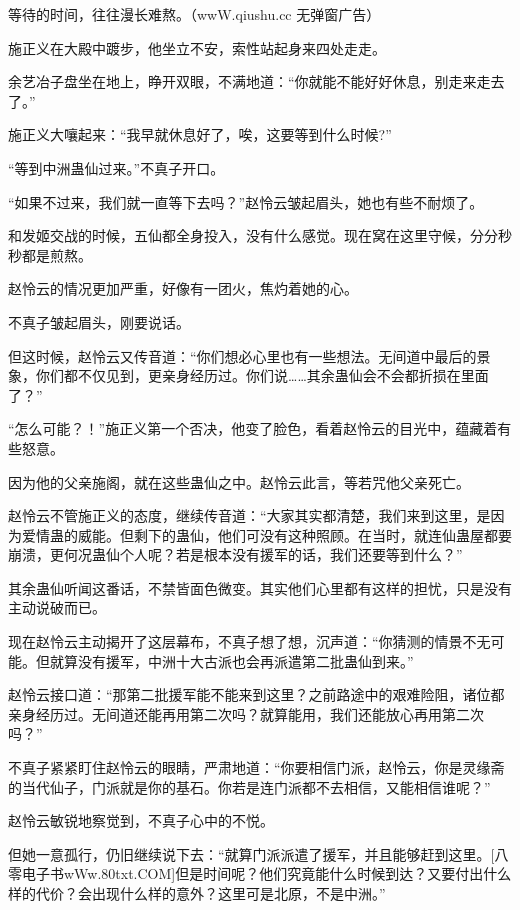 
\begin{this_body}

等待的时间，往往漫长难熬。（wwW.qiushu.cc 无弹窗广告）

施正义在大殿中踱步，他坐立不安，索性站起身来四处走走。

余艺冶子盘坐在地上，睁开双眼，不满地道：“你就能不能好好休息，别走来走去了。”

施正义大嚷起来：“我早就休息好了，唉，这要等到什么时候?”

“等到中洲蛊仙过来。”不真子开口。

“如果不过来，我们就一直等下去吗？”赵怜云皱起眉头，她也有些不耐烦了。

和发姬交战的时候，五仙都全身投入，没有什么感觉。现在窝在这里守候，分分秒秒都是煎熬。

赵怜云的情况更加严重，好像有一团火，焦灼着她的心。

不真子皱起眉头，刚要说话。

但这时候，赵怜云又传音道：“你们想必心里也有一些想法。无间道中最后的景象，你们都不仅见到，更亲身经历过。你们说……其余蛊仙会不会都折损在里面了？”

“怎么可能？！”施正义第一个否决，他变了脸色，看着赵怜云的目光中，蕴藏着有些怒意。

因为他的父亲施阁，就在这些蛊仙之中。赵怜云此言，等若咒他父亲死亡。

赵怜云不管施正义的态度，继续传音道：“大家其实都清楚，我们来到这里，是因为爱情蛊的威能。但剩下的蛊仙，他们可没有这种照顾。在当时，就连仙蛊屋都要崩溃，更何况蛊仙个人呢？若是根本没有援军的话，我们还要等到什么？”

其余蛊仙听闻这番话，不禁皆面色微变。其实他们心里都有这样的担忧，只是没有主动说破而已。

现在赵怜云主动揭开了这层幕布，不真子想了想，沉声道：“你猜测的情景不无可能。但就算没有援军，中洲十大古派也会再派遣第二批蛊仙到来。”

赵怜云接口道：“那第二批援军能不能来到这里？之前路途中的艰难险阻，诸位都亲身经历过。无间道还能再用第二次吗？就算能用，我们还能放心再用第二次吗？”

不真子紧紧盯住赵怜云的眼睛，严肃地道：“你要相信门派，赵怜云，你是灵缘斋的当代仙子，门派就是你的基石。你若是连门派都不去相信，又能相信谁呢？”

赵怜云敏锐地察觉到，不真子心中的不悦。

但她一意孤行，仍旧继续说下去：“就算门派派遣了援军，并且能够赶到这里。[八零电子书wWw.80txt.COM]但是时间呢？他们究竟能什么时候到达？又要付出什么样的代价？会出现什么样的意外？这里可是北原，不是中洲。”


\end{this_body}
